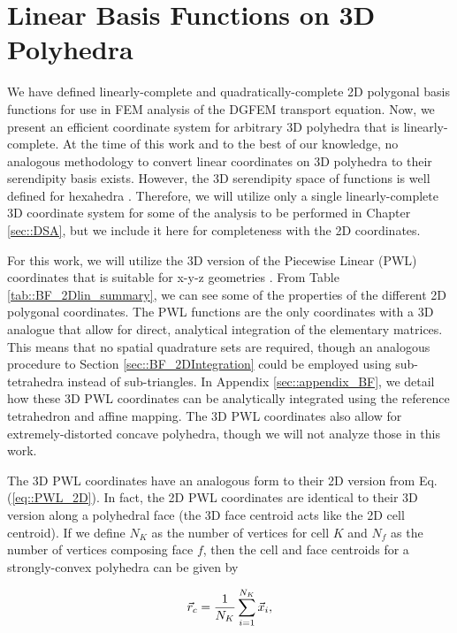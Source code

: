 \section{Linear Basis Functions on 3D Polyhedra}
\label{sec::BF_3DLinear}


We have defined linearly-complete and quadratically-complete 2D polygonal basis functions for use in FEM analysis of the DGFEM transport equation. Now, we present an efficient coordinate system for arbitrary 3D polyhedra that is linearly-complete. At the time of this work and to the best of our knowledge, no analogous methodology to convert linear coordinates on 3D polyhedra to their serendipity basis exists. However, the 3D serendipity space of functions is well defined for hexahedra \cite{arnold2011serendipity}. Therefore, we will utilize only a single linearly-complete 3D coordinate system for some of the analysis to be performed in Chapter \ref{sec::DSA}, but we include it here for completeness with the 2D coordinates.

For this work, we will utilize the 3D version of the Piecewise Linear (PWL) coordinates that is suitable for x-y-z geometries \cite{bailey2008phd}. From Table \ref{tab::BF_2Dlin_summary}, we can see some of the properties of the different 2D polygonal coordinates. The PWL functions are the only coordinates with a 3D analogue that allow for direct, analytical integration of the elementary matrices. This means that no spatial quadrature sets are required, though an analogous procedure to Section \ref{sec::BF_2DIntegration} could be employed using sub-tetrahedra instead of sub-triangles. In Appendix \ref{sec::appendix_BF}, we detail how these 3D PWL coordinates can be analytically integrated using the reference tetrahedron and affine mapping. The 3D PWL coordinates also allow for extremely-distorted concave polyhedra, though we will not analyze those in this work.

The 3D PWL coordinates have an analogous form to their 2D version from Eq. (\ref{eq::PWL_2D}). In fact, the 2D PWL coordinates are identical to their 3D version along a polyhedral face (the 3D face centroid acts like the 2D cell centroid). If we define $N_K$ as the number of vertices for cell $K$ and $N_f$ as the number of vertices composing face $f$, then the cell and face centroids for a strongly-convex polyhedra can be given by

\begin{equation}
\label{eq::PWL_3D_cell_center}
	\vec{r}_{c} = \frac{1}{N_K} \sum\displaylimits_{i=1}^{N_K} \vec{x}_i ,
\end{equation}

